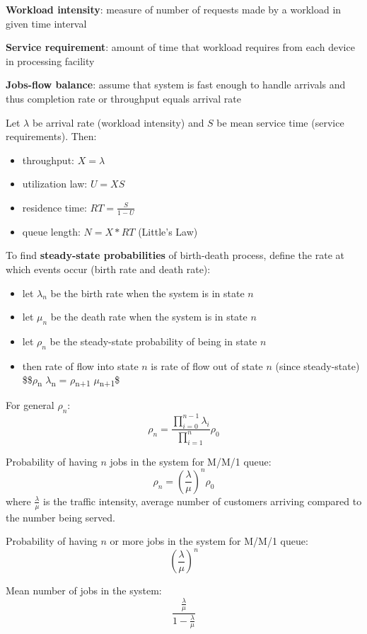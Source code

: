 \documentclass[11pt]{article}
\begin{document}
\textbf{Workload intensity}: measure of number of requests made by a workload in given
time interval

\textbf{Service requirement}: amount of time that workload requires from each device in
processing facility

\textbf{Jobs-flow balance}: assume that system is fast enough to handle arrivals and thus
completion rate or throughput equals arrival rate

Let \(\lambda\) be arrival rate (workload intensity) and \(S\) be mean service time (service
requirements).
Then:
\begin{itemize}
\item throughput: \(X = \lambda\)
\item utilization law: \(U = XS\)
\item residence time: \(RT = \frac{S}{1 - U}\)
\item queue length: \(N = X * RT\) (Little's Law)
\end{itemize}

To find \textbf{steady-state probabilities} of birth-death process, define the rate
at which events occur (birth rate and death rate):
\begin{itemize}
\item let \(\lambda_{n}\) be the birth rate when the system is in state \(n\)
\item let \(\mu_{n}\) be the death rate when the system is in state \(n\)
\item let \(\rho_{n}\) be the steady-state probability of being in state \(n\)
\item then rate of flow into state \(n\) is rate of flow out of state \(n\) (since
steady-state)
\$\$\(\rho\)\textsubscript{n} \(\lambda\)\textsubscript{n} = \(\rho\)\textsubscript{n+1} \(\mu\)\textsubscript{n+1}\$
\end{itemize}

For general \(\rho_{n}\):
$$ \rho_{n} = \frac{\prod_{i=0}^{n-1} \lambda_{i}}{\prod_{i=1}^{n}} \rho_{0} $$

Probability of having \(n\) jobs in the system for M/M/1 queue:
$$ \rho_{n} = \left( \frac{\lambda}{\mu} \right)^{n} \rho_{0} $$
where \(\frac{\lambda}{\mu}\) is the traffic intensity, average number of customers
arriving compared to the number being served.

Probability of having \(n\) or more jobs in the system for M/M/1 queue:
$$ \left( \frac{\lambda}{\mu} \right)^{n} $$

Mean number of jobs in the system:
$$ \frac{\frac{\lambda}{\mu}}{1 - \frac{\lambda}{\mu}} $$
\end{document}
